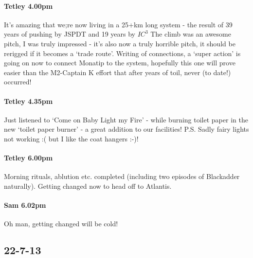 \paragraph{Tetley 4.00pm}
It’s amazing that we;re now living in a 25+km long system - the result of 39 years of pushing by JSPDT and 19 years by $IC^3$ The  climb was an awesome pitch, I was truly impressed - it’s also now a truly horrible pitch, it should be rerigged if it becomes a ‘trade route’. Writing of connections, a ‘super action’ is going on now to connect Monatip to the system, hopefully this one will prove easier than the M2-Captain K effort that after years of toil, never (to date!) occurred!


\paragraph{Tetley 4.35pm}
Just listened to ‘Come on Baby Light my Fire’ - while burning toilet paper in the new ‘toilet paper burner’ - a great addition to our facilities!
P.S. Sadly fairy lights not working :( but I like the coat hangers :-)!

\paragraph{Tetley 6.00pm}
Morning rituals, ablution etc. completed (including two episodes of Blackadder naturally). Getting changed now to head off to Atlantis.


\paragraph{Sam 6.02pm}
Oh man, getting changed will be cold!

\subsection{22-7-13}

